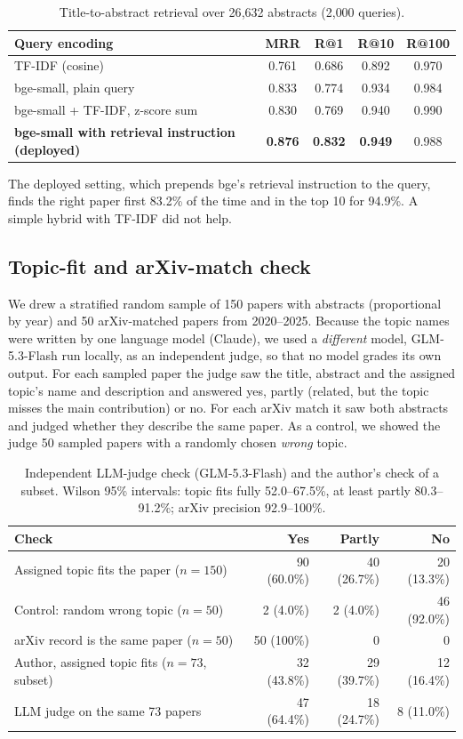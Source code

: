 \documentclass{article}
\begin{document}
\begin{table}[t]
\centering\small
\caption{Title-to-abstract retrieval over 26{,}632 abstracts (2{,}000 queries).}
\label{tab:search}
\begin{tabular}{lcccc}
\toprule
Query encoding & MRR & R@1 & R@10 & R@100 \\
\midrule
TF-IDF (cosine) & 0.761 & 0.686 & 0.892 & 0.970 \\
bge-small, plain query & 0.833 & 0.774 & 0.934 & 0.984 \\
bge-small + TF-IDF, z-score sum & 0.830 & 0.769 & 0.940 & 0.990 \\
\textbf{bge-small with retrieval instruction (deployed)} & \textbf{0.876} & \textbf{0.832} & \textbf{0.949} & 0.988 \\
\bottomrule
\end{tabular}
\end{table}

The deployed setting, which prepends bge's retrieval instruction to the query, finds the right paper first 83.2\% of the time and in the top 10 for 94.9\%. A simple hybrid with TF-IDF did not help.

\subsection{Topic-fit and arXiv-match check}
\label{sec:check}
We drew a stratified random sample of 150 papers with abstracts (proportional by year) and 50 arXiv-matched papers from 2020--2025. Because the topic names were written by one language model (Claude), we used a \emph{different} model, GLM-5.3-Flash run locally, as an independent judge, so that no model grades its own output. For each sampled paper the judge saw the title, abstract and the assigned topic's name and description and answered yes, partly (related, but the topic misses the main contribution) or no. For each arXiv match it saw both abstracts and judged whether they describe the same paper. As a control, we showed the judge 50 sampled papers with a randomly chosen \emph{wrong} topic.

\begin{table}[t]
\centering\small
\caption{Independent LLM-judge check (GLM-5.3-Flash) and the author's check of a subset. Wilson 95\% intervals: topic fits fully 52.0--67.5\%, at least partly 80.3--91.2\%; arXiv precision 92.9--100\%.}
\label{tab:judge}
\begin{tabular}{lrrr}
\toprule
Check & Yes & Partly & No \\
\midrule
Assigned topic fits the paper ($n=150$) & 90 (60.0\%) & 40 (26.7\%) & 20 (13.3\%) \\
Control: random wrong topic ($n=50$) & 2 (4.0\%) & 2 (4.0\%) & 46 (92.0\%) \\
arXiv record is the same paper ($n=50$) & 50 (100\%) & 0 & 0 \\
\midrule
Author, assigned topic fits ($n=73$, subset) & 32 (43.8\%) & 29 (39.7\%) & 12 (16.4\%) \\
LLM judge on the same 73 papers & 47 (64.4\%) & 18 (24.7\%) & 8 (11.0\%) \\
\bottomrule
\end{tabular}
\end{table}
\end{document}

